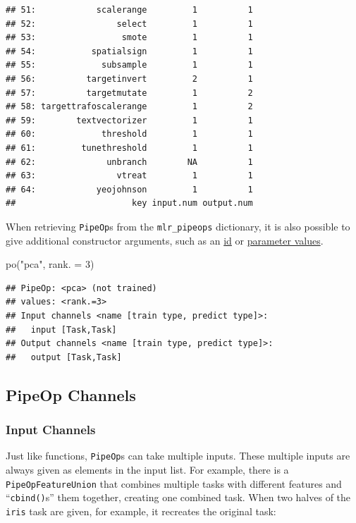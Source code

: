 \documentclass[
]{scrbook}
\newenvironment{Shaded}{\begin{snugshade}}{\end{snugshade}}
\newcommand{\AttributeTok}[1]{\textcolor[rgb]{0.77,0.63,0.00}{#1}}
\newcommand{\DecValTok}[1]{\textcolor[rgb]{0.00,0.00,0.81}{#1}}
\newcommand{\FunctionTok}[1]{\textcolor[rgb]{0.00,0.00,0.00}{#1}}
\newcommand{\NormalTok}[1]{#1}
\newcommand{\StringTok}[1]{\textcolor[rgb]{0.31,0.60,0.02}{#1}}
\renewenvironment{Shaded} {\begin{snugshade}\small} {\end{snugshade}}
\begin{document}
\begin{verbatim}
## 51:            scalerange         1          1
## 52:                select         1          1
## 53:                 smote         1          1
## 54:           spatialsign         1          1
## 55:             subsample         1          1
## 56:          targetinvert         2          1
## 57:          targetmutate         1          2
## 58: targettrafoscalerange         1          2
## 59:        textvectorizer         1          1
## 60:             threshold         1          1
## 61:         tunethreshold         1          1
## 62:              unbranch        NA          1
## 63:                vtreat         1          1
## 64:            yeojohnson         1          1
##                       key input.num output.num
\end{verbatim}

When retrieving \texttt{PipeOp}s from the \texttt{mlr\_pipeops} dictionary, it is also possible to give additional constructor arguments, such as an \protect\hyperlink{pipeop-ids-and-id-name-clashes}{id} or \protect\hyperlink{hyperparameters}{parameter values}.

\begin{Shaded}
\begin{Highlighting}[]
\FunctionTok{po}\NormalTok{(}\StringTok{"pca"}\NormalTok{, }\AttributeTok{rank. =} \DecValTok{3}\NormalTok{)}
\end{Highlighting}
\end{Shaded}

\begin{verbatim}
## PipeOp: <pca> (not trained)
## values: <rank.=3>
## Input channels <name [train type, predict type]>:
##   input [Task,Task]
## Output channels <name [train type, predict type]>:
##   output [Task,Task]
\end{verbatim}

\hypertarget{pipeop-channels}{%
\subsection{PipeOp Channels}\label{pipeop-channels}}

\hypertarget{input-channels}{%
\subsubsection{Input Channels}\label{input-channels}}

Just like functions, \texttt{PipeOp}s can take multiple inputs.
These multiple inputs are always given as elements in the input list.
For example, there is a \texttt{PipeOpFeatureUnion} that combines multiple tasks with different features and ``\texttt{cbind()}s'' them together, creating one combined task.
When two halves of the \texttt{iris} task are given, for example, it recreates the original task:
\end{document}

